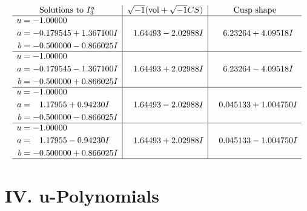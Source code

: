 \documentclass[1p]{elsarticle_modified}
\theoremstyle{definition}
\newcommand{\I}{\sqrt{-1}}
\begin{document}
$$\begin{array}{c|c|c}  
\text{Solutions to }I^u_{3}& \I (\text{vol} + \sqrt{-1}CS) & \text{Cusp shape}\\
 \hline 
\begin{aligned}
u &= -1.00000\phantom{ +0.000000I} \\
a &= -0.179545 + 1.367100 I \\
b &= -0.500000 - 0.866025 I\end{aligned}
 & \phantom{-}1.64493 - 2.02988 I & \phantom{-}6.23264 + 4.09518 I \\ \hline\begin{aligned}
u &= -1.00000\phantom{ +0.000000I} \\
a &= -0.179545 - 1.367100 I \\
b &= -0.500000 + 0.866025 I\end{aligned}
 & \phantom{-}1.64493 + 2.02988 I & \phantom{-}6.23264 - 4.09518 I \\ \hline\begin{aligned}
u &= -1.00000\phantom{ +0.000000I} \\
a &= \phantom{-}1.17955 + 0.94230 I \\
b &= -0.500000 - 0.866025 I\end{aligned}
 & \phantom{-}1.64493 - 2.02988 I & \phantom{-}0.045133 + 1.004750 I \\ \hline\begin{aligned}
u &= -1.00000\phantom{ +0.000000I} \\
a &= \phantom{-}1.17955 - 0.94230 I \\
b &= -0.500000 + 0.866025 I\end{aligned}
 & \phantom{-}1.64493 + 2.02988 I & \phantom{-}0.045133 - 1.004750 I\\
 \hline 
 \end{array}$$\newpage
\newpage\renewcommand{\arraystretch}{1}
\centering \section*{ IV. u-Polynomials}
\end{document}
